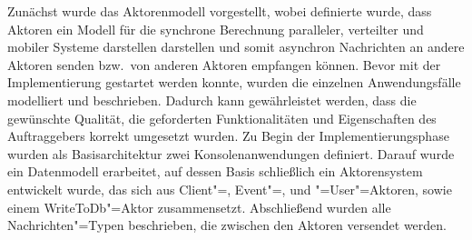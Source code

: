 

Zunächst wurde das Aktorenmodell vorgestellt, wobei definierte wurde, dass Aktoren ein Modell für die synchrone Berechnung paralleler, verteilter und mobiler Systeme darstellen darstellen und somit asynchron Nachrichten an andere Aktoren senden bzw.\ von anderen Aktoren empfangen können.
Bevor mit der Implementierung gestartet werden konnte, wurden die einzelnen Anwendungsfälle modelliert und beschrieben.
Dadurch kann gewährleistet werden, dass die gewünschte Qualität, die geforderten Funktionalitäten und Eigenschaften des Auftraggebers korrekt umgesetzt wurden.
Zu Begin der Implementierungsphase wurden als Basisarchitektur zwei Konsolenanwendungen definiert.
Darauf wurde ein Datenmodell erarbeitet, auf dessen Basis schließlich ein Aktorensystem entwickelt wurde, das sich aus Client"=, Event"=, und "=User"=Aktoren, sowie einem WriteToDb"=Aktor zusammensetzt.
Abschließend wurden alle Nachrichten"=Typen beschrieben, die zwischen den Aktoren versendet werden.
